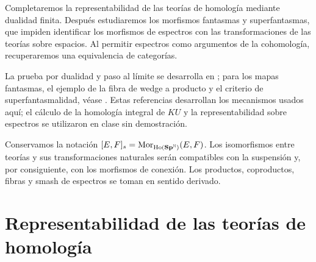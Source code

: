 
Completaremos la representabilidad de las teorías de homología mediante dualidad finita. Después estudiaremos los morfismos fantasmas y superfantasmas, que impiden identificar los morfismos de espectros con las transformaciones de las teorías sobre espacios. Al permitir espectros como argumentos de la cohomología, recuperaremos una equivalencia de categorías.

La prueba por dualidad y paso al límite se desarrolla en \cite[teorema~4.2.3.4]{malkiewich}; para los mapas fantasmas, el ejemplo de la fibra de wedge a producto y el criterio de superfantasmalidad, véase \cite[\S\S6.1 y~6.3, lema~6.9]{christensen1998}. Estas referencias desarrollan los mecanismos usados aquí; el cálculo de la homología integral de $KU$ y la representabilidad sobre espectros se utilizaron en clase sin demostración.

Conservamos la notación $[E,F]_s=\operatorname{Mor}_{\operatorname{Ho}(\mathbf{Sp}^{\mathbb N})}(E,F)$. Los isomorfismos entre teorías y sus transformaciones naturales serán compatibles con la suspensión y, por consiguiente, con los morfismos de conexión. Los productos, coproductos, fibras y smash de espectros se toman en sentido derivado.


\section{Representabilidad de las teorías de homología}

